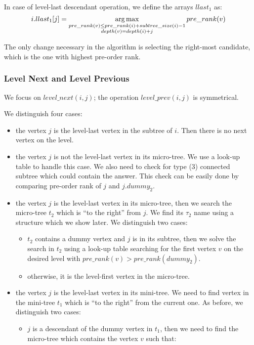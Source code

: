 In case of level-last descendant operation, we define the arrays $llast_1$ as:
$$ i.llast_1[j] = \operatorname*{arg\,max}_{\substack{pre\_rank(v) \le pre\_rank(i) + subtree\_size(i) - 1  \\ depth(v) = depth(i) + j}} pre\_rank(v) $$

The only change necessary in the algorithm is selecting the right-most candidate, which is the one with highest pre-order rank.

\subsubsection{Level Next and Level Previous}

We focus on $level\_next(i, j)$; the operation $level\_prev(i, j)$ is symmetrical.

We distinguish four cases:
\begin{itemize}
	\item the vertex $j$ is the level-last vertex in the subtree of $i$.
	Then there is no next vertex on the level.
	\item the vertex $j$ is not the level-last vertex in its micro-tree.
	We use a look-up table to handle this case.
	We also need to check for type (3) connected subtree which could contain the answer.
	This check can be easily done by comparing pre-order rank of $j$ and $j.dummy_2$.
	\item the vertex $j$ is the level-last vertex in its micro-tree, then we search the micro-tree $t_2$ which is ``to the right'' from $j$.
	We find its $\tau_2$ name using a structure which we show later.
	We distinguish two cases:
	\begin{itemize}
		\item $t_2$ contains a dummy vertex and $j$ is in its subtree, then we solve the search in $t_2$ using a look-up table searching for the first vertex $v$ on the desired level with $pre\_rank(v) > pre\_rank(dummy_2)$.
		\item otherwise, it is the level-first vertex in the micro-tree.
	\end{itemize}
	\item the vertex $j$ is the level-last vertex in its mini-tree.
	We need to find vertex in the mini-tree $t_1$ which is ``to the right'' from the current one.
	As before, we distinguish two cases:
	\begin{itemize}
		\item $j$ is a descendant of the dummy vertex in $t_1$, then we need to find the micro-tree which contains the vertex $v$ such that:

\end{itemize}
\end{itemize}
